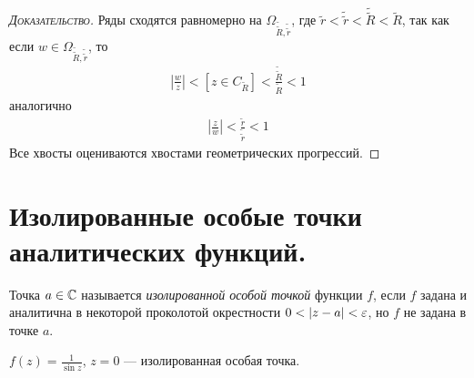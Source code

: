 \documentclass[../complex-analysis.tex]{subfiles}
\begin{document}
\begin{proof}[\normalfont\textsc{Доказательство}]
 Ряды сходятся равномерно на $ \Omega_{\tilde{\tilde R}, \tilde{\tilde r}} $, где $ \tilde r < \tilde{\tilde r} < \tilde {\tilde R} < \tilde R $, так как если $ w \in \Omega_{\tilde{\tilde R}, \tilde{\tilde r}} $, то
 \begin{align*}
  \left| \frac{w}{z} \right| < [z \in C_{\tilde R}] < \frac{\tilde{\tilde R}}{\tilde R} < 1
 \end{align*} аналогично
 \begin{align*}
  \left| \frac{z}{w} \right| < \frac{\tilde r}{\tilde{\tilde r}} < 1
 \end{align*} Все хвосты оцениваются хвостами геометрических прогрессий.
\end{proof}

\newpage
\section{Изолированные особые точки аналитических функций.}
\begin{df}
 Точка $ a \in \mathbb{C} $ называется \textit{изолированной особой точкой} функции $ f $, если $ f $ задана и аналитична в некоторой проколотой окрестности $ 0 < \left| z-a \right| < \varepsilon $, но $ f $ не задана в точке $ a $.
\end{df}
\begin{exmpl}
 $ f(z) = \frac{1}{\sin z} $, $ z = 0 $ --- изолированная особая точка.
\end{exmpl}
\end{document}
